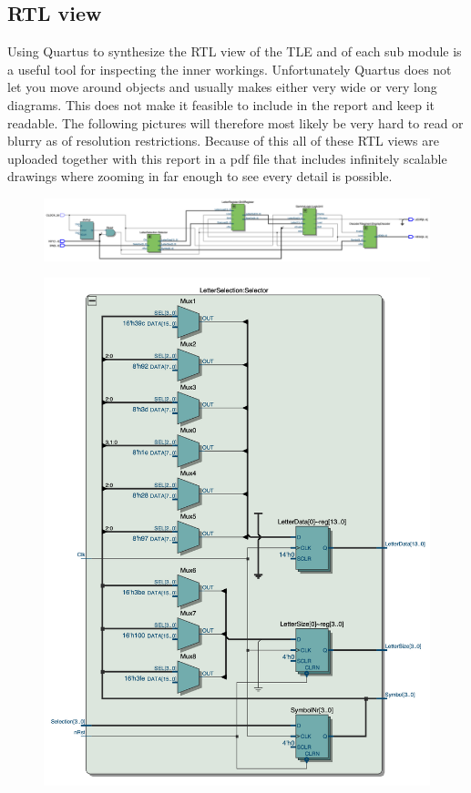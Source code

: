 \documentclass{article}
\begin{document}
\clearpage
\subsection{RTL view}
Using Quartus to synthesize the RTL view of the TLE and of each sub module is a useful tool for inspecting the inner workings. Unfortunately Quartus does not let you move around objects and usually makes either very wide or very long diagrams. This does not make it feasible to include in the report and keep it readable. The following pictures will therefore most likely be very hard to read or blurry as of resolution restrictions. Because of this all of these RTL views are uploaded together with this report in a pdf file that includes infinitely scalable drawings where zooming in far enough to see every detail is possible.
\hspace{3cm}

\begin{figure}[h]
    \centering
    \includegraphics[width=1\textwidth]{Figures/RTL_TLE.jpg}
    \label{fig:RTL_TLE}
\end{figure}

\clearpage

\begin{figure}[h]
    \centering
    \includegraphics[width=1\textwidth]{Figures/RTL_Selector.jpg}
    \label{fig:RTL_Sel}
\end{figure}
\end{document}
